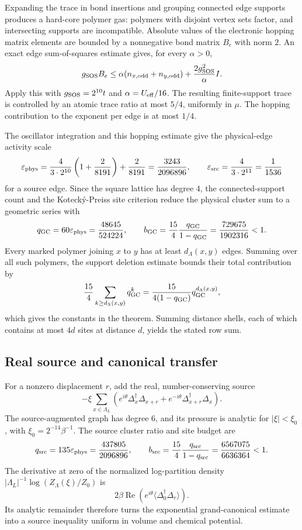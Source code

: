 \documentclass[11pt]{article}
\newcommand{\Deltaop}{\Delta}
\begin{document}
Expanding the trace in bond insertions and grouping connected edge supports produces a hard-core polymer gas: polymers with disjoint vertex sets factor, and intersecting supports are incompatible. Absolute values of the electronic hopping matrix elements are bounded by a nonnegative bond matrix $B_e$ with norm $2$. An exact edge sum-of-squares estimate gives, for every $\alpha>0$,
\[
g_{\rm SOS} B_e\le \alpha(n_{x,\mathrm{odd}}+n_{y,\mathrm{odd}})
+\frac{2g_{\rm SOS}^2}{\alpha}I.
\]
Apply this with $g_{\rm SOS}=2^{10}t$ and $\alpha=U_{\rm eff}/16$. The resulting finite-support trace is controlled by an atomic trace ratio at most $5/4$, uniformly in $\mu$. The hopping contribution to the exponent per edge is at most $1/4$.

The oscillator integration and this hopping estimate give the physical-edge activity scale
\[
\varepsilon_{\rm phys}
=\frac{4}{3\cdot2^{10}}\left(1+\frac{2}{8191}\right)
+\frac{2}{8191}
=\frac{3243}{2096896},
\qquad
\varepsilon_{\rm src}=\frac{4}{3\cdot2^{11}}=\frac1{1536}
\]
for a source edge. Since the square lattice has degree $4$, the connected-support count and the Koteck\'y-Preiss site criterion \cite{koteckyPreiss} reduce the physical cluster sum to a geometric series with
\[
q_{\rm GC}=60\varepsilon_{\rm phys}=\frac{48645}{524224},\qquad
b_{\rm GC}=\frac{15}{4}\frac{q_{\rm GC}}{1-q_{\rm GC}}
=\frac{729675}{1902316}<1.
\]
Every marked polymer joining $x$ to $y$ has at least $d_\Lambda(x,y)$ edges. Summing over all such polymers, the support deletion estimate bounds their total contribution by
\[
\frac{15}{4}\sum_{k\ge d_\Lambda(x,y)}q_{\rm GC}^k
=\frac{15}{4(1-q_{\rm GC})}q_{\rm GC}^{d_\Lambda(x,y)},
\]
which gives the constants in the theorem. Summing distance shells, each of which contains at most $4d$ sites at distance $d$, yields the stated row sum.

\subsection{Real source and canonical transfer}

For a nonzero displacement $r$, add the real, number-conserving source
\[
-\xi\sum_{x\in\Lambda_L}
\left(e^{i\theta}\Deltaop_x^\dagger\Deltaop_{x+r}
+e^{-i\theta}\Deltaop_{x+r}^\dagger\Deltaop_x\right).
\]
The source-augmented graph has degree $6$, and its pressure is analytic for $|\xi|<\xi_0$, with $\xi_0=2^{-14}\beta^{-1}$. The source cluster ratio and site budget are
\[
q_{\rm src}=135\varepsilon_{\rm phys}=\frac{437805}{2096896},
\qquad
b_{\rm src}=\frac{15}{4}\frac{q_{\rm src}}{1-q_{\rm src}}
=\frac{6567075}{6636364}<1.
\]
The derivative at zero of the normalized log-partition density $|\Lambda_L|^{-1}\log(Z_\Lambda(\xi)/Z_0)$ is
\[
2\beta\operatorname{Re}\left(e^{i\theta}\langle\Deltaop_0^\dagger\Deltaop_r\rangle\right).
\]
Its analytic remainder therefore turns the exponential grand-canonical estimate into a source inequality uniform in volume and chemical potential.
\end{document}
